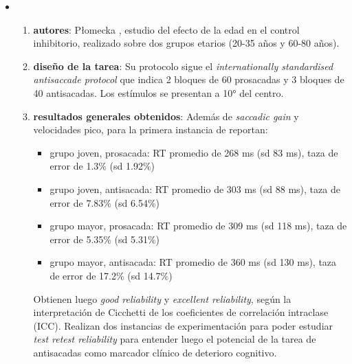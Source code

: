 \begin{itemize}
  \item \begin{enumerate}
    \item \textbf{autores}:
      P{\l}omecka \etal \cite{plomecka_2020_retest_reliability}, estudio
      del efecto de la edad en el control inhibitorio, realizado sobre dos
      grupos etarios (20-35 años y 60-80 años).
    \item \textbf{diseño de la tarea}:
      Su protocolo sigue el \textit{internationally standardised antisaccade
      protocol} \cite{antoniades_2013_standarized_protocol} que indica 2
      bloques de 60 prosacadas y 3 bloques de 40 antisacadas.
      Los estímulos se presentan a 10° del centro.
    \item \textbf{resultados generales obtenidos}:
      Además de \textit{saccadic gain} y velocidades pico, para la primera
      instancia de reportan: \begin{itemize}
        \item grupo joven, prosacada: RT promedio de 268 ms (sd 83 ms), taza de
        error de 1.3\% (sd 1.92\%)
        \item grupo joven, antisacada: RT promedio de 303 ms (sd 88 ms), taza
        de error de 7.83\% (sd 6.54\%)
        \item grupo mayor, prosacada: RT promedio de 309 ms (sd 118 ms), taza
        de error de 5.35\% (sd 5.31\%)
        \item grupo mayor, antisacada: RT promedio de 360 ms (sd 130 ms), taza
        de error de 17.2\% (sd 14.7\%)
      \end{itemize}
      Obtienen luego \textit{good reliability} y \textit{excellent
      reliability}, según la interpretación de Cicchetti  de los
      coeficientes de correlación intraclase (ICC).
      Realizan dos instancias de experimentación para poder estudiar
      \textit{test retest reliability} para entender luego el potencial de la
      tarea de antisacadas como marcador clínico de deterioro cognitivo.
  \end{enumerate}

\end{itemize}

